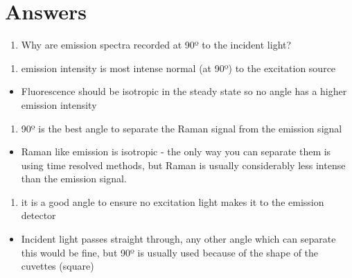\documentclass[
]{book}
\providecommand{\tightlist}{%
  \setlength{\itemsep}{0pt}\setlength{\parskip}{0pt}}
\begin{document}
\hypertarget{answers}{%
\section{Answers}\label{answers}}

\begin{enumerate}
\def\labelenumi{\arabic{enumi}.}
\tightlist
\item
  Why are emission spectra recorded at 90º to the incident light?
\end{enumerate}

\begin{enumerate}
\def\labelenumi{\alph{enumi}.}
\tightlist
\item
  emission intensity is most intense normal (at 90º) to the excitation source
\end{enumerate}

\begin{itemize}
\tightlist
\item
  Fluorescence should be isotropic in the steady state so no angle has a higher emission intensity
\end{itemize}

\begin{enumerate}
\def\labelenumi{\alph{enumi}.}
\setcounter{enumi}{1}
\tightlist
\item
  90º is the best angle to separate the Raman signal from the emission signal
\end{enumerate}

\begin{itemize}
\tightlist
\item
  Raman like emission is isotropic - the only way you can separate them is using time resolved methods, but Raman is usually considerably less intense than the emission signal.
\end{itemize}

\begin{enumerate}
\def\labelenumi{\alph{enumi}.}
\setcounter{enumi}{2}
\tightlist
\item
  { it is a good angle to ensure no excitation light makes it to the emission detector }
\end{enumerate}

\begin{itemize}
\tightlist
\item
  Incident light passes straight through, any other angle which can separate this would be fine, but 90º is usually used because of the shape of the cuvettes (square)
\end{itemize}
\end{document}
